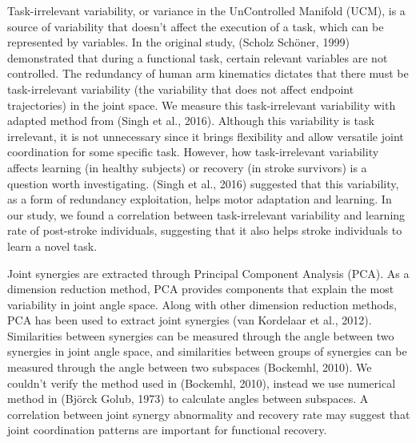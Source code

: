 Task-irrelevant variability, or variance in the UnControlled Manifold (UCM), is a source of variability that doesn’t affect the execution of a task, which can be represented by variables. 
In the original study, (Scholz  Schöner, 1999) demonstrated that during a functional task, certain relevant variables are not controlled.
The redundancy of human arm kinematics dictates that there must be task-irrelevant variability (the variability that does not affect endpoint trajectories) in the joint space. 
We measure this task-irrelevant variability with adapted method from (Singh et al., 2016). 
Although this variability is task irrelevant, it is not unnecessary since it brings flexibility and allow versatile joint coordination for some specific task. 
However, how task-irrelevant variability affects learning (in healthy subjects) or recovery (in stroke survivors) is a question worth investigating. 
(Singh et al., 2016) suggested that this variability, as a form of redundancy exploitation, helps motor adaptation and learning. 
In our study, we found a correlation between task-irrelevant variability and learning rate of post-stroke individuals, suggesting that it also helps stroke individuals to learn a novel task.

Joint synergies are extracted through Principal Component Analysis (PCA). 
As a dimension reduction method, PCA provides components that explain the most variability in joint angle space. 
Along with other dimension reduction methods, PCA has been used to extract joint synergies (van Kordelaar et al., 2012). 
Similarities between synergies can be measured through the angle between two synergies in joint angle space, and similarities between groups of synergies can be measured through the angle between two subspaces (Bockemhl, 2010). 
We couldn’t verify the method used in (Bockemhl, 2010), instead we use numerical method in (Björck  Golub, 1973) to calculate angles between subspaces. 
A correlation between joint synergy abnormality and recovery rate may suggest that joint coordination patterns are important for functional recovery.

